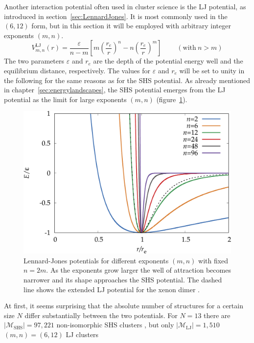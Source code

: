 Another interaction potential often used in cluster science is the \acf{LJ}
potential, as introduced in section~\ref{sec:LennardJones}. It is most commonly
used in the $(6,12)$ form, but in this section it will be employed with
arbitrary integer exponents $(m,n)$.
%
\begin{equation}
    V_{m,n}^\mathrm{LJ}(r)=\frac{\varepsilon}{n-m}\left[m\left(\frac{r_e}{r}\right)^{n}-n\left(\frac{r_e}{r}\right)^{m}\right] \ \ \ \ \ \ \ \ \ \  (\mathrm{with}\ n > m)
\label{eqn:nmpot}
\end{equation}
%
The two parameters $\varepsilon$ and $r_e$ are the depth of the potential energy
well and the equilibrium distance, respectively. The values for $\varepsilon$
and $r_e$ will be set to unity in the following for the same reasons as for the
\ac{SHS} potential. As already mentioned in chapter~\ref{sec:energylandscapes},
the \ac{SHS} potential emerges from the \ac{LJ} potential as the limit for large
exponents $(m,n)$ (figure~\ref{fig:LJ}).
%
\begin{figure}[htb]\centering
    \includegraphics[width=0.8\columnwidth]{kslj/exampleLJ.pdf}
    \caption{Lennard-Jones potentials for different exponents $(m,n)$ with
    fixed $n=2m$. As the exponents grow larger the well of attraction becomes narrower 
    and its shape approaches the \acs{SHS} potential. The dashed line
    shows the extended LJ potential for the xenon dimer \autocite{Jerabek_relativisticcoupledclusterinteraction_2017}.}
    \label{fig:LJ}
\end{figure}
%
At first, it seems surprising that the absolute number of structures for a
certain size $N$ differ substantially between the two potentials. For $N=13$
there are $|\mathcal{M}_\mathrm{SHS}|=97,221$ non-isomorphic \ac{SHS} clusters
\autocite{Hoy_Structuredynamicsmodel_2015,Holmes-Cerfon_EnumeratingRigidSphere_2016},
but only $|\mathcal{M}_\mathrm{LJ}|=1,510$ $(m,n) = (6,12)$ \ac{LJ} clusters
